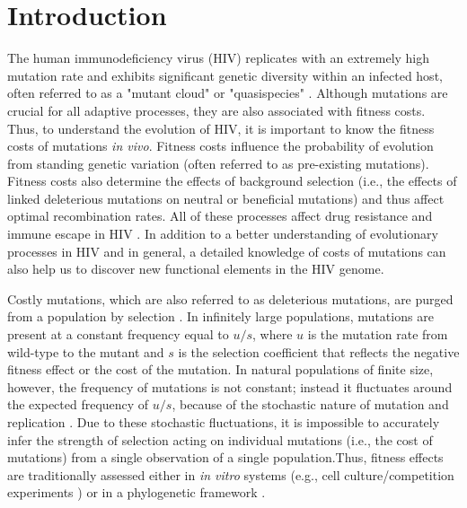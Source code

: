 \documentclass{article}
\begin{document}
\section{Introduction}
The human immunodeficiency virus (HIV) replicates with an extremely high mutation rate and exhibits significant genetic diversity within an infected host, often referred to as a "mutant cloud" or "quasispecies" \cite{batschelet1976proportion,domingo1978nucleotide, eigen1993viral,rouzine2001transition, wilke2005quasispecies, biebricher2006quasispecies,lauring2010quasispecies}. Although mutations are crucial for all adaptive processes, they are also associated with fitness costs.   
Thus, to understand the evolution of HIV, it is important to know the fitness costs of mutations \textit {in vivo}. Fitness costs influence the probability of evolution from standing genetic variation (often referred to as pre-existing mutations). Fitness costs also determine the effects of background selection (i.e., the effects of linked deleterious mutations on neutral or beneficial mutations) and thus affect optimal recombination rates. 
All of these processes affect drug resistance and immune escape in HIV \cite{pennings2012standing, Paredes:2010aa, li2011low, neher2010recombination, batorsky2011estimate}. %
In addition to a better understanding of evolutionary processes in HIV and in general, a detailed knowledge of costs of mutations can also help us to discover new functional elements in the HIV genome.

Costly mutations, which are also referred to as deleterious mutations, are purged from a population by selection \cite{hartl1997principles, trottermutation}. In infinitely large populations, mutations are present at a constant frequency equal to $u/s$, where $u$ is the mutation rate from wild-type to the mutant and $s$ is the selection coefficient that reflects the negative fitness effect or the cost of the mutation. In natural populations of finite size, however, the frequency of mutations is not constant; instead it fluctuates around the expected frequency of $u/s$, because of the stochastic nature of mutation and replication \cite{hartl1997principles}. Due to these stochastic fluctuations, it is impossible to accurately infer the strength of selection acting on individual mutations (i.e., the cost of mutations) from a single observation of a single population.Thus, fitness effects are traditionally assessed either in \textit {in vitro} systems (e.g., cell culture/competition experiments \cite{sanjuan2004distribution, acevedo2014mutational,thyagarajan2014inherent}) or in a phylogenetic framework \cite{lawrie2014comparative,eyre2007distribution,mayrose2013synonymous}. 
\end{document}
